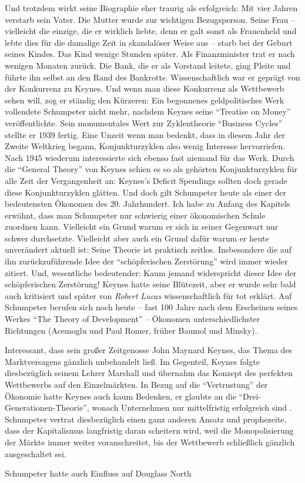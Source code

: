 Und trotzdem wirkt seine Biographie eher traurig als erfolgreich: Mit vier Jahren verstarb sein Vater. Die Mutter wurde zur wichtigen Bezugsperson. Seine Frau -- vielleicht die einzige, die er wirklich liebte, denn er galt sonst als Frauenheld und lebte dies für die damalige Zeit in skandalöser Weise aus -- starb bei der Geburt seines Kindes. Das Kind wenige Stunden später. 
Als Finanzminister trat er nach wenigen Monaten zurück. Die Bank, die er als Vorstand leitete, ging Pleite und führte ihn selbst an den Rand des Bankrotts. Wissenschaftlich war er geprägt von der Konkurrenz zu Keynes. Und wenn man diese Konkurrenz als Wettbewerb sehen will, zog er ständig den Kürzeren: Ein begonnenes geldpolitisches Werk vollendete Schumpeter nicht mehr, nachdem Keynes seine "`Treatise on Money"' veröffentlichte. Sein monumentales Wert zur Zyklentheorie "`Business Cycles"' stellte er 1939 fertig. Eine Unzeit wenn man bedenkt, dass in diesem Jahr der Zweite Weltkrieg begann, Konjunkturzyklen also wenig Interesse hervorriefen. Nach 1945 wiederum interessierte sich ebenso fast niemand für das Werk. Durch die "`General Theory"' von Keynes schien es so als gehörten Konjunkturzyklen für alle Zeit der Vergangenheit an: Keynes's Deficit Spendings sollten doch gerade diese Konjunkturzyklen glätten.
Und doch gilt Schumpeter heute als einer der bedeutensten Ökonomen des 20. Jahrhundert. Ich habe zu Anfang des Kapitels erwähnt, dass man Schumpeter nur schwierig einer ökonomischen Schule zuordnen kann. Vielleicht ein Grund warum er sich in seiner Gegenwart nur schwer durchsetzte. Vielleicht aber auch ein Grund dafür warum er heute unverändert aktuell ist: Seine Theorie ist praktisch zeitlos. Insbesondere die auf ihn zurückzuführende Idee der "`schöpferischen Zerstörung"' wird immer wieder zitiert. Und, wesentliche bedeutender: Kaum jemand widerspricht dieser Idee der schöpferischen Zerstörung! Keynes hatte seine Blütezeit, aber er wurde sehr bald auch kritisiert und später von \textit{Robert Lucas} wissenschaftlich für tot erklärt. Auf Schumpeter berufen sich noch heute -- fast 100 Jahre nach dem Erscheinen seines Werkes "`The Theory of Development"' -- Ökonomen unterschiedlichster Richtungen (Acemoglu und Paul Romer, früher Baumol und Minsky).

Interessant, dass sein großer Zeitgenosse John Maynard Keynes, das Thema des Marktversagens gänzlich unbehandelt ließ. Im Gegenteil, Keynes folgte diesbezüglich seinem Lehrer Marshall und übernahm das Konzept des perfekten Wettbewerbs auf den Einzelmärkten. In Bezug auf die "`Vertrustung"' der Ökonomie hatte Keynes auch kaum Bedenken, er glaubte an die "`Drei-Generationen-Theorie"', wonach Unternehmen nur mittelfristig erfolgreich sind \parencite[S. 93]{Snowdon2005}. Schumpeter vertrat diesbezüglich einen ganz anderen Ansatz und prophezeite, dass der Kapitalismus langfristig daran scheitern wird, weil die Monopolisierung der Märkte immer weiter voranschreitet, bis der Wettbewerb schließlich gänzlich ausgeschaltet sei.

Schumpeter hatte auch Einfluss auf Douglass North \textcite[S. 11]{Menard2014}